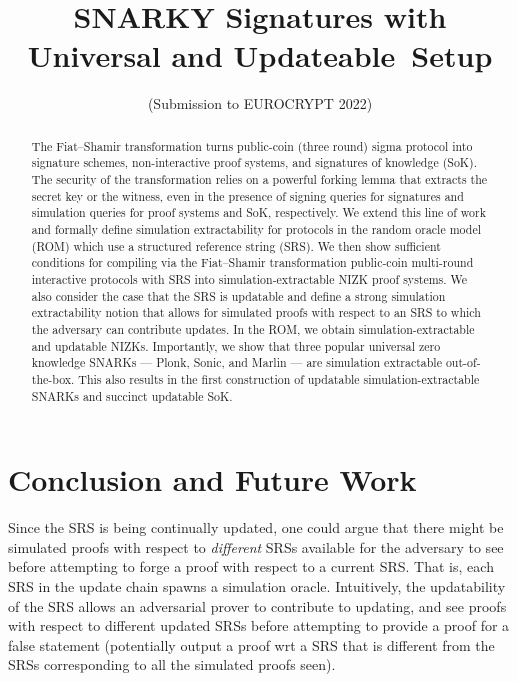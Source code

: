 \documentclass[10pt]{llncs}
\title{SNARKY Signatures with Universal and Updateable~Setup}
\author{(Submission to EUROCRYPT 2022)}
\institute{}
\begin{document}
 \sloppy
\maketitle

\begin{abstract}
The Fiat--Shamir transformation turns public-coin (three round) sigma protocol into signature schemes, non-interactive proof systems, and signatures of knowledge (SoK).  The security of the transformation relies on a powerful forking lemma that extracts the secret key or the witness, even in the presence of signing queries for signatures and simulation queries for proof systems and SoK, respectively.
We extend this line of work and formally define simulation extractability for protocols in the random oracle model (ROM) which use a structured reference string (SRS). We then show sufficient conditions for compiling via the Fiat--Shamir transformation public-coin multi-round interactive protocols with SRS into simulation-extractable NIZK proof systems. We also consider the case that the SRS is updatable and define a strong simulation extractability notion that allows for simulated proofs with respect to an SRS to which the adversary can contribute updates.
In the ROM, we obtain simulation-extractable and updatable NIZKs. Importantly, we show that three popular universal zero knowledge SNARKs --- Plonk, Sonic, and Marlin --- are simulation extractable out-of-the-box. This also results in the first construction of updatable simulation-extractable SNARKs and succinct updatable SoK.
\end{abstract}

\ifupdate
%



%




\section{Conclusion and Future Work}

Since the SRS is being continually updated, one could argue that there might be simulated proofs with respect to \textit{different} SRSs available for the adversary to see before attempting to forge a proof with respect to a current SRS.
That is, each SRS in the update chain spawns a simulation oracle. Intuitively, the updatability of the SRS allows an adversarial prover to contribute to updating, and see proofs with respect to different updated SRSs before attempting to provide a proof for a false statement (potentially output a proof wrt a SRS that is different from the SRSs corresponding to all the simulated proofs seen).
\end{document}
